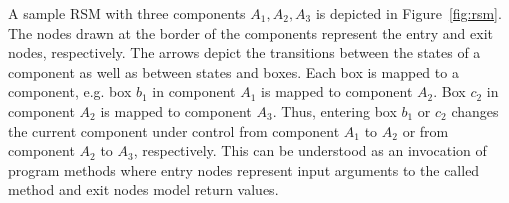 \documentclass[a4paper, 12pt, twoside]{report}
\begin{document}
	A sample RSM with three components $A_1, A_2, A_3$ is depicted in Figure~\ref{fig:rsm}. The nodes drawn at the border of the components represent the entry and exit nodes, respectively. The arrows depict the transitions between the states of a component as well as between states and boxes. Each box is mapped to a component, e.g. box $b_1$ in component $A_1$ is mapped to component $A_2$. Box $c_2$ in component $A_2$ is mapped to component $A_3$. Thus, entering box $b_1$ or $c_2$ changes the current component under control from component $A_1$ to $A_2$ or from component $A_2$ to $A_3$, respectively. This can be understood as an invocation of program methods where entry nodes represent input arguments to the called method and exit nodes model return values. \\
	
\end{document}

